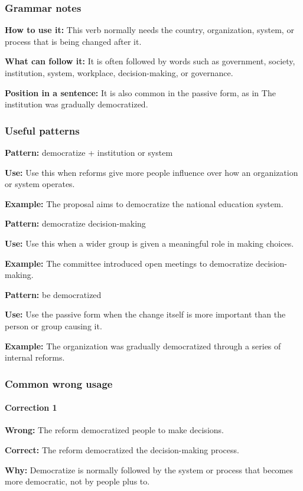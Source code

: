 \documentclass[11pt]{article}
\begin{document}
\subsubsection{Grammar notes}
\textbf{How to use it:} This verb normally needs the country, organization, system, or process that is being changed after it.

\textbf{What can follow it:} It is often followed by words such as government, society, institution, system, workplace, decision-making, or governance.

\textbf{Position in a sentence:} It is also common in the passive form, as in The institution was gradually democratized.

\subsubsection{Useful patterns}
\textbf{Pattern:} democratize + institution or system

\textbf{Use:} Use this when reforms give more people influence over how an organization or system operates.

\textbf{Example:} The proposal aims to democratize the national education system.

\textbf{Pattern:} democratize decision-making

\textbf{Use:} Use this when a wider group is given a meaningful role in making choices.

\textbf{Example:} The committee introduced open meetings to democratize decision-making.

\textbf{Pattern:} be democratized

\textbf{Use:} Use the passive form when the change itself is more important than the person or group causing it.

\textbf{Example:} The organization was gradually democratized through a series of internal reforms.

\subsubsection{Common wrong usage}
\paragraph{Correction 1}
\textbf{Wrong:} The reform democratized people to make decisions.

\textbf{Correct:} The reform democratized the decision-making process.

\textbf{Why:} Democratize is normally followed by the system or process that becomes more democratic, not by people plus to.
\end{document}
